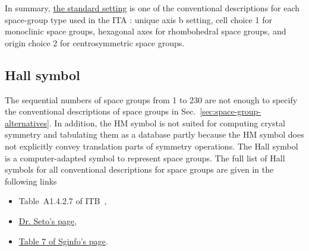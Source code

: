 In summary, \href{https://www.cryst.ehu.es/cgi-bin/cryst/programs/nph-def-choice}{the standard setting} is one of the conventional descriptions for each space-group type used in the ITA \cite{ITA2016}: unique axis b setting, cell choice 1 for monoclinic space groups, hexagonal axes for rhombohedral space groups, and origin choice 2 for centrosymmetric space groups.

\subsection{Hall symbol}

The sequential numbers of space groups from 1 to 230 are not enough to specify the conventional descriptions of space groups in Sec.~\ref{sec:space-group-alternatives}.
In addition, the HM symbol is not suited for computing crystal symmetry and tabulating them as a database partly because the HM symbol does not explicitly convey translation parts of symmetry operations.
The Hall symbol \cite{Hall:a19707} is a computer-adapted symbol to represent space groups.
The full list of Hall symbols for all conventional descriptions for space groups are given in the following links
\begin{itemize}
  \item Table~A1.4.2.7 of ITB~\cite{ITB2010},
  \item \href{https://yseto.net/?page_id=29}{Dr. Seto's page},
  \item \href{http://cci.lbl.gov/sginfo/hall_symbols.html}{Table 7 of Sginfo's page}.
\end{itemize}
